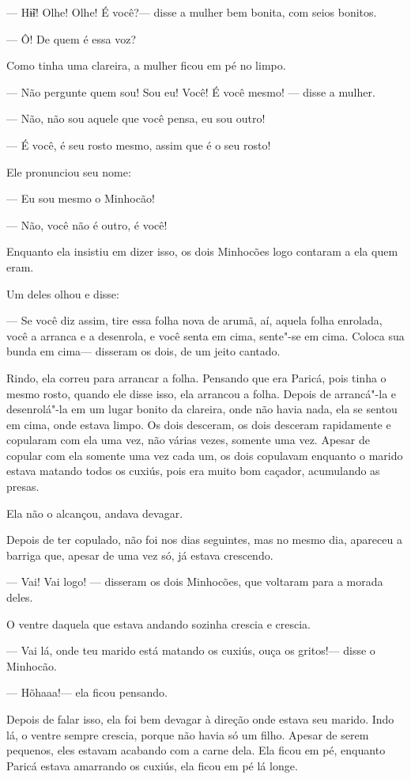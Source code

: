 --- Hɨ̃ɨ! Olhe! Olhe! É você?--- disse a mulher bem bonita, com seios
bonitos.

--- Ô! De quem é essa voz?

Como tinha uma clareira, a mulher ficou em pé no limpo. 

--- Não pergunte quem sou! Sou eu! Você! É você mesmo! --- disse a
mulher.

--- Não, não sou aquele que você pensa, eu sou outro! 

--- É você, é seu rosto mesmo, assim que é o seu rosto! 

Ele pronunciou seu nome: 

--- Eu sou mesmo o Minhocão!

--- Não, você não é outro, é você! 

Enquanto ela insistiu em dizer isso, os dois Minhocões logo contaram a ela quem eram. 

Um deles olhou e disse: 

--- Se você diz assim, tire essa folha nova de arumã, aí, aquela folha
enrolada, você a arranca e a desenrola, e você senta em cima, sente"-se
em cima. Coloca sua bunda em cima--- disseram os dois, de um jeito
cantado. 

Rindo, ela correu para arrancar a folha. Pensando que era Paricá, pois
tinha o mesmo rosto, quando ele disse isso, ela arrancou a folha. Depois
de arrancá"-la e desenrolá"-la em um lugar bonito da clareira, onde não
havia nada, ela se sentou em cima, onde estava limpo. Os dois desceram,
os dois desceram rapidamente e copularam com ela uma vez, não várias
vezes, somente uma vez. Apesar de copular  com ela somente uma vez cada um, os dois copulavam enquanto o marido estava matando todos os cuxiús,
pois era muito bom caçador, acumulando as presas. 

Ela não o alcançou, andava devagar. 

Depois de ter copulado, não foi nos dias seguintes, mas no mesmo dia,
apareceu a barriga que, apesar de uma vez só, já estava crescendo. 

--- Vai! Vai logo! --- disseram os dois Minhocões, que voltaram para a
morada deles. 

O ventre daquela que estava andando sozinha crescia e crescia. 

--- Vai lá, onde teu marido está matando os cuxiús, ouça os gritos!---
disse o Minhocão. 

--- Hõhaaa!--- ela ficou pensando.

Depois de falar isso, ela foi bem devagar à direção onde estava seu
marido. Indo lá, o ventre sempre crescia, porque não havia só um filho.
Apesar de serem pequenos, eles estavam acabando com a carne dela. Ela
ficou em pé, enquanto Paricá estava amarrando os cuxiús, ela ficou em pé
lá longe. 

